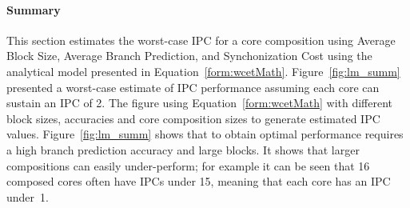 \paragraph{Summary}

This section estimates the worst-case IPC for a core composition using Average Block Size, Average Branch Prediction, and Synchonization Cost using the analytical model presented in Equation~\ref{form:wcetMath}.
Figure~\ref{fig:lm_summ} presented a worst-case estimate of IPC performance assuming each core can sustain an IPC of 2.
The figure using Equation~\ref{form:wcetMath} with different block sizes, accuracies and core composition sizes to generate estimated IPC values.
Figure~\ref{fig:lm_summ} shows that to obtain optimal performance requires a high branch prediction accuracy and large blocks.
It shows that larger compositions can easily under-perform; for example it can be seen that 16 composed cores often have IPCs under 15, meaning that each core has an IPC under~1.

